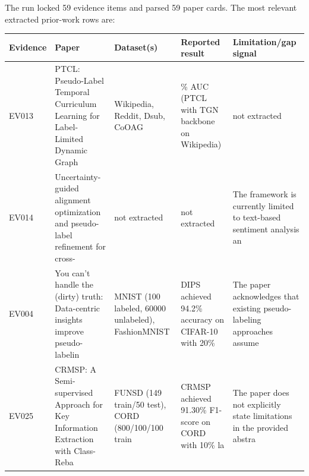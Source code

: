 \documentclass[
  11pt,
]{article}
\newcounter{none} %
\begin{document}
The run locked 59 evidence items and parsed 59 paper cards. The most relevant extracted prior-work rows are:

{\def\LTcaptype{none} %
\begin{longtable}[]{@{}
  >{\raggedright\arraybackslash}p{}
  >{\raggedright\arraybackslash}p{}
  >{\raggedright\arraybackslash}p{}
  >{\raggedright\arraybackslash}p{}
  >{\raggedright\arraybackslash}p{}@{}}
\toprule\noalign{}
\begin{minipage}[b]{\linewidth}\raggedright
Evidence
\end{minipage} & \begin{minipage}[b]{\linewidth}\raggedright
Paper
\end{minipage} & \begin{minipage}[b]{\linewidth}\raggedright
Dataset(s)
\end{minipage} & \begin{minipage}[b]{\linewidth}\raggedright
Reported result
\end{minipage} & \begin{minipage}[b]{\linewidth}\raggedright
Limitation/gap signal
\end{minipage} \\
\midrule\noalign{}
\endhead
\bottomrule\noalign{}
\endlastfoot
EV013 & PTCL: Pseudo-Label Temporal Curriculum Learning for Label-Limited Dynamic Graph & Wikipedia, Reddit, Dsub, CoOAG & 87.97\% AUC (PTCL with TGN backbone on Wikipedia) & not extracted \\
EV014 & Uncertainty-guided alignment optimization and pseudo-label refinement for cross- & not extracted & not extracted & The framework is currently limited to text-based sentiment analysis an \\
EV004 & You can't handle the (dirty) truth: Data-centric insights improve pseudo-labelin & MNIST (100 labeled, 60000 unlabeled), FashionMNIST & DIPS achieved 94.2\% accuracy on CIFAR-10 with 20\% & The paper acknowledges that existing pseudo-labeling approaches assume \\
EV025 & CRMSP: A Semi-supervised Approach for Key Information Extraction with Class-Reba & FUNSD (149 train/50 test), CORD (800/100/100 train & CRMSP achieved 91.30\% F1-score on CORD with 10\% la & The paper does not explicitly state limitations in the provided abstra \\

\end{longtable}}
\end{document}
